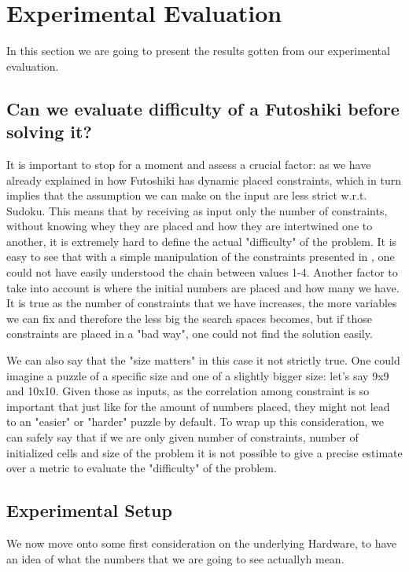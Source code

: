 \section{Experimental Evaluation}
\label{sec:evaluation}

In this section we are going to present the results gotten from our experimental evaluation.



\subsection{Can we evaluate difficulty of a Futoshiki before solving it?}
\label{subsec:futoshiki_difficulty}
It is important to stop for a moment and assess a crucial factor: as we have already explained in  how Futoshiki has dynamic placed constraints, which in turn implies that the assumption we can make on the input are less strict w.r.t. Sudoku. This means that by receiving as input only the number of constraints, without knowing whey they are placed and how they are intertwined one to another, it is extremely hard to define the actual "difficulty" of the problem. It is easy to see that with a simple manipulation of the constraints presented in , one could not have easily understood the chain between values 1-4. Another factor to take into account is where the initial numbers are placed and how many we have. It is true as the number of constraints that we have increases, the more variables we can fix and therefore the less big the search spaces becomes, but if those constraints are placed in a "bad way", one could not find the solution easily.

We can also say that the "size matters" in this case it not strictly true. One could imagine a puzzle of a specific size and one of a slightly bigger size: let's say 9x9 and 10x10. Given those as inputs, as the correlation among constraint is so important that just like for the amount of numbers placed, they might not lead to an "easier" or "harder" puzzle by default.
To wrap up this consideration, we can safely say that if we are only given number of constraints, number of initialized cells and size of the problem it is not possible to give a precise estimate over a metric to evaluate the "difficulty" of the problem.

\subsection{Experimental Setup}
We now move onto some first consideration on the underlying Hardware, to have an idea of what the numbers that we are going to see actuallyh mean.


